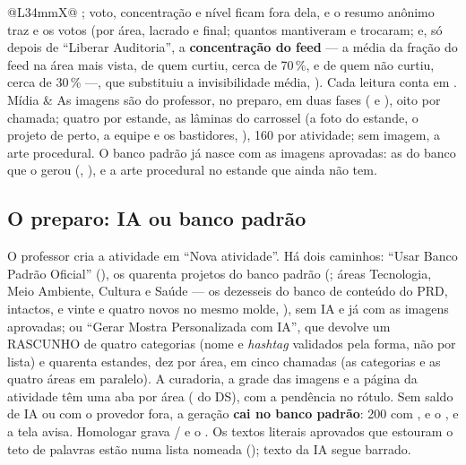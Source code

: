 \begin{tabularx}{\linewidth}{@{}L{34mm}X@{}}
  ; voto, concentração e nível ficam fora dela, e o resumo anônimo
  traz  e os votos (por área, lacrado e
  final; quantos mantiveram e trocaram; e, só depois de \enquote{Liberar
  Auditoria}, a \textbf{concentração do feed} --- a média da fração do feed na
  área mais vista, de quem curtiu, cerca de 70\,\%, e de quem não curtiu, cerca
  de 30\,\% ---, que substituiu a invisibilidade média, ). Cada leitura conta em
  .\\
\zebra Mídia & As imagens são do professor, no preparo, em duas fases
  ( e ), oito por chamada; quatro por
  estande, as lâminas do carrossel (a foto do estande, o projeto de perto, a
  equipe e os bastidores, ), 160 por atividade; sem imagem, a
  arte procedural. O banco padrão já nasce com as
  imagens aprovadas: as do banco que o  gerou
  (, ), e a arte
  procedural no estande que ainda não tem.\\
\bottomrule
\end{tabularx}

\subsection{O preparo: IA ou banco padrão}

O professor cria a atividade em \enquote{Nova atividade}. Há dois caminhos:
\enquote{Usar Banco Padrão Oficial} (), os quarenta projetos do banco padrão
(; áreas Tecnologia, Meio Ambiente, Cultura e Saúde ---
os dezesseis do banco de conteúdo do PRD, intactos, e vinte e quatro novos no
mesmo molde, ), sem IA e já com as imagens aprovadas; ou
\enquote{Gerar Mostra Personalizada com IA}, que devolve um RASCUNHO de quatro
categorias (nome e \emph{hashtag} validados pela forma, não por lista) e
quarenta estandes, dez por área, em cinco chamadas (as categorias e as quatro
áreas em paralelo). A curadoria, a grade das imagens e a página da atividade
têm uma aba por área ( do DS), com a pendência no rótulo. Sem saldo de IA ou com o provedor fora, a geração \textbf{cai no
banco padrão}: 200 com ,  e o
, e a tela avisa. Homologar grava / e o
. Os textos literais aprovados que estouram o teto de
palavras estão numa lista nomeada (); texto da IA segue
barrado.


